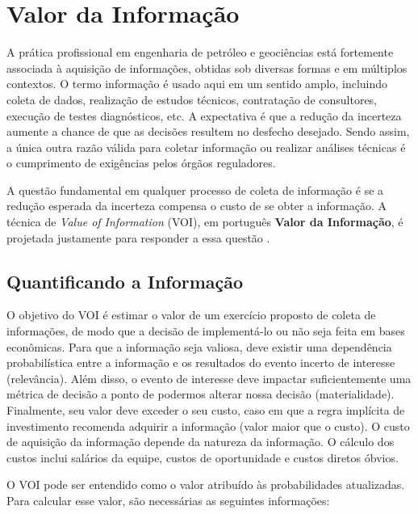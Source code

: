\section{Valor da Informação}

A prática profissional em engenharia de petróleo e geociências está fortemente associada à aquisição de informações, obtidas sob diversas formas e em múltiplos contextos. O termo informação é usado aqui em um sentido amplo, incluindo coleta de dados, realização de estudos técnicos, contratação de consultores, execução de testes diagnósticos, etc. A expectativa é que a redução da incerteza aumente a chance de que as decisões resultem no desfecho desejado. Sendo assim, a única outra razão válida para coletar informação ou realizar análises técnicas é o cumprimento de exigências pelos órgãos reguladores.

A questão fundamental em qualquer processo de coleta de informação é se a redução esperada da incerteza compensa o custo de se obter a informação. A técnica de \textit{Value of Information} (VOI), em português \textbf{Valor da Informação}, é projetada justamente para responder a essa questão \cite{01}.

\subsection{Quantificando a Informação}

O objetivo do VOI é estimar o valor de um exercício proposto de coleta de informações, de modo que a decisão de implementá-lo ou não seja feita em bases econômicas. Para que a informação seja valiosa, deve existir uma dependência probabilística entre a informação e os resultados do evento incerto de interesse (relevância). Além disso, o evento de interesse deve impactar suficientemente uma métrica de decisão a ponto de podermos alterar nossa decisão (materialidade). Finalmente, seu valor deve exceder o seu custo, caso em que a regra implícita de investimento recomenda adquirir a informação (valor maior que o custo). O custo de aquisição da informação depende da natureza da informação. O cálculo dos custos inclui salários da equipe, custos de oportunidade e custos diretos óbvios.  

O VOI pode ser entendido como o valor atribuído às probabilidades atualizadas. Para calcular esse valor, são necessárias as seguintes informações:  

